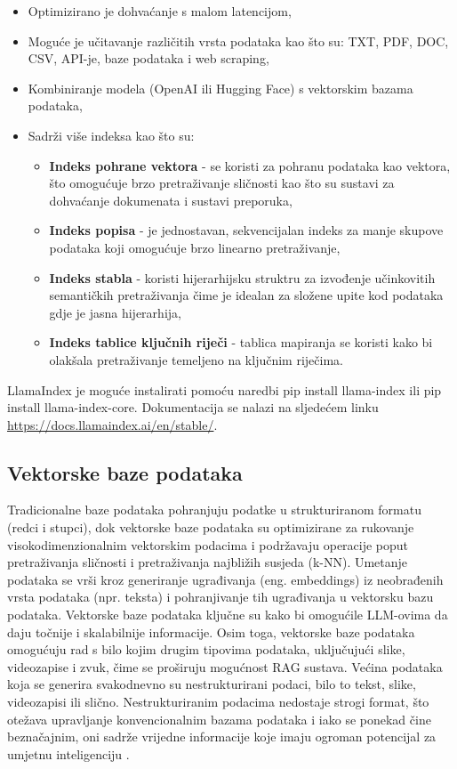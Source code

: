 \documentclass[]{foi}
\begin{document}
\begin{itemize}
    \item Optimizirano je dohvaćanje s malom latencijom,
    \item Moguće je učitavanje različitih vrsta podataka kao što su: TXT, PDF, DOC, CSV, API-je, baze podataka i web scraping,
    \item Kombiniranje modela (OpenAI ili Hugging Face) s vektorskim bazama podataka,
    \item Sadrži više indeksa kao što su:
    \begin{itemize}
        \item \textbf{Indeks pohrane vektora} - se koristi za pohranu podataka kao vektora, što omogućuje brzo pretraživanje sličnosti kao što su sustavi za dohvaćanje dokumenata i sustavi preporuka,
        \item \textbf{Indeks popisa} - je jednostavan, sekvencijalan indeks za manje skupove podataka koji omogućuje brzo linearno pretraživanje,
        \item \textbf{Indeks stabla} - koristi hijerarhijsku struktru za izvođenje učinkovitih semantičkih pretraživanja čime je idealan za složene upite kod podataka gdje je jasna hijerarhija,
        \item \textbf{Indeks tablice ključnih riječi} - tablica mapiranja se koristi kako bi olakšala pretraživanje temeljeno na ključnim riječima.
    \end{itemize}
\end{itemize}

LlamaIndex je moguće instalirati pomoću naredbi pip install llama-index ili pip install llama-index-core. Dokumentacija se nalazi na sljedećem linku \url{https://docs.llamaindex.ai/en/stable/}.

\subsection{Vektorske baze podataka}
Tradicionalne baze podataka pohranjuju podatke u strukturiranom formatu (redci i stupci), dok vektorske baze podataka su optimizirane za rukovanje
visokodimenzionalnim vektorskim podacima i podržavaju operacije poput pretraživanja sličnosti i pretraživanja najbližih susjeda (k-NN). Umetanje
podataka se vrši kroz generiranje ugrađivanja (eng. embeddings) iz neobrađenih vrsta podataka (npr. teksta) i pohranjivanje tih ugrađivanja u vektorsku bazu podataka.
Vektorske baze podataka ključne su kako bi omogućile LLM-ovima da daju točnije i skalabilnije informacije. 
Osim toga, vektorske baze podataka omogućuju rad s bilo kojim drugim tipovima podataka, uključujući slike, videozapise i zvuk, čime se proširuju mogućnost RAG sustava.
Većina podataka koja se generira svakodnevno su nestrukturirani podaci, bilo to tekst, slike, videozapisi ili slično. 
Nestrukturiranim podacima nedostaje strogi format, što otežava upravljanje konvencionalnim bazama podataka i iako se ponekad čine beznačajnim,
oni sadrže vrijedne informacije koje imaju ogroman potencijal za umjetnu inteligenciju \cite{aquino2025vector}.
\end{document}
